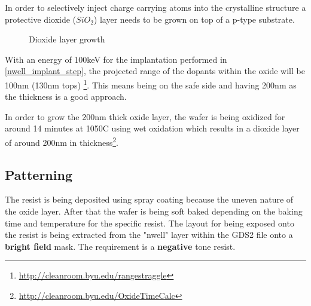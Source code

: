 In order to selectively inject charge carrying atoms into the crystalline structure a protective dioxide ($SiO_2$) layer needs to be grown on top of a p-type substrate.

\begin{figure}[H]
	\centering
	\begin{tikzpicture}[node distance = 3cm, auto, thick,scale=\CrossSectionOnly, every node/.style={transform shape}]
		
	\end{tikzpicture}
	\begin{tikzpicture}[node distance = 3cm, auto, thick,scale=\CrossSectionOnly, every node/.style={transform shape}]
		
	\end{tikzpicture}
	\caption{Dioxide layer growth}
\end{figure}

With an energy of 100keV for the implantation performed in \autoref{nwell_implant_step}, the projected range of the dopants within the oxide will be 100nm (130nm tops) \footnote{\url{http://cleanroom.byu.edu/rangestraggle}}.
This means being on the safe side and having 200nm as the thickness is a good approach.

In order to grow the 200nm thick oxide layer, the wafer is being oxidized for around 14 minutes at 1050\degree C using wet oxidation which results in a dioxide layer of around 200nm in thickness\footnote{\url{http://cleanroom.byu.edu/OxideTimeCalc}}.

\subsection{Patterning}

The resist is being deposited using spray coating because the uneven nature of the oxide layer.
After that the wafer is being soft baked depending on the baking time and temperature for the specific resist.
The layout for being exposed onto the resist is being extracted from the "nwell" layer within the GDS2 file onto a \textbf{bright field} mask.
The requirement is a \textbf{negative} tone resist.

